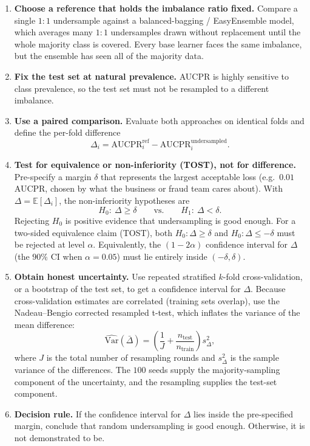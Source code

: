 \documentclass[11pt]{article}
\begin{document}
\begin{enumerate}
    \item \textbf{Choose a reference that holds the imbalance ratio fixed.} Compare a single \(1{:}1\) undersample against a balanced-bagging / EasyEnsemble model, which averages many \(1{:}1\) undersamples drawn without replacement until the whole majority class is covered. Every base learner faces the same imbalance, but the ensemble has seen all of the majority data.
    \item \textbf{Fix the test set at natural prevalence.} AUCPR is highly sensitive to class prevalence, so the test set must not be resampled to a different imbalance.
    \item \textbf{Use a paired comparison.} Evaluate both approaches on identical folds and define the per-fold difference
    \[
    \Delta_i=\mathrm{AUCPR}^{\text{ref}}_i-\mathrm{AUCPR}^{\text{undersampled}}_i .
    \]
    \item \textbf{Test for equivalence or non-inferiority (TOST), not for difference.} Pre-specify a margin \(\delta\) that represents the largest acceptable loss (e.g.\ \(0.01\) AUCPR, chosen by what the business or fraud team cares about). With \(\Delta=\mathbb E[\Delta_i]\), the non-inferiority hypotheses are
    \[
    H_0:\ \Delta \ge \delta
    \qquad\text{vs.}\qquad
    H_1:\ \Delta < \delta .
    \]
    Rejecting \(H_0\) is positive evidence that undersampling is good enough. For a two-sided equivalence claim (TOST), both \(H_0:\Delta\ge\delta\) and \(H_0:\Delta\le-\delta\) must be rejected at level \(\alpha\). Equivalently, the \((1-2\alpha)\) confidence interval for \(\Delta\) (the \(90\%\) CI when \(\alpha=0.05\)) must lie entirely inside \((-\delta,\delta)\).
    \item \textbf{Obtain honest uncertainty.} Use repeated stratified \(k\)-fold cross-validation, or a bootstrap of the test set, to get a confidence interval for \(\Delta\). Because cross-validation estimates are correlated (training sets overlap), use the Nadeau--Bengio corrected resampled t-test, which inflates the variance of the mean difference:
    \[
    \widehat{\mathrm{Var}}(\bar\Delta)
    =
    \left(\frac{1}{J}+\frac{n_{\text{test}}}{n_{\text{train}}}\right)s_\Delta^{2},
    \]
    where \(J\) is the total number of resampling rounds and \(s_\Delta^{2}\) is the sample variance of the differences. The \(100\) seeds supply the majority-sampling component of the uncertainty, and the resampling supplies the test-set component.
    \item \textbf{Decision rule.} If the confidence interval for \(\Delta\) lies inside the pre-specified margin, conclude that random undersampling is good enough. Otherwise, it is not demonstrated to be.
\end{enumerate}
\end{document}

